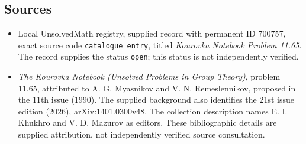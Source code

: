\documentclass[11pt]{article}
\begin{document}
\subsection{Sources}
\begin{itemize}
\item Local UnsolvedMath registry, supplied record with permanent ID \(700757\), exact source code \texttt{catalogue entry}, titled \emph{Kourovka Notebook Problem 11.65}. The record supplies the status \texttt{open}; this status is not independently verified.
\item \emph{The Kourovka Notebook (Unsolved Problems in Group Theory)}, problem 11.65, attributed to A. G. Myasnikov and V. N. Remeslennikov, proposed in the 11th issue (1990). The supplied background also identifies the 21st issue edition (2026), arXiv:1401.0300v48. The collection description names E. I. Khukhro and V. D. Mazurov as editors. These bibliographic details are supplied attribution, not independently verified source consultation.
\end{itemize}
\end{document}
